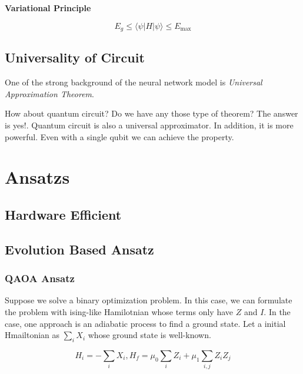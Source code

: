 \begin{principle}
    \textbf{Variational Principle}

    \begin{equation}
        E_{g} \leq \langle \psi | H | \psi \rangle \leq E_{\mbox{max}}
    \end{equation}
\end{principle}

\subsection{Universality of Circuit}

One of the strong background of the neural network model is 
\textit{Universal Approximation Theorem}. 

How about quantum circuit? Do we have any those type of theorem?
The answer is yes!. Quantum circuit is also a universal approximator.
In addition, it is more powerful. Even with a single qubit we can achieve the property\cite{PhysRevA.104.012405-Universal-approxi}.

\section{}

\section{Ansatzs}

\subsection{Hardware Efficient}

\subsection{Evolution Based Ansatz}

\subsubsection{QAOA Ansatz}

Suppose we solve a binary optimization problem.
In this case, we can formulate the problem with ising-like Hamilotnian whose terms only have $Z$ and $I$.
In the case, one approach is an adiabatic process to find a ground state.
Let a initial Hmailtonian as $\sum_i X_i$ whose ground state is well-known.

\begin{equation}
    H_i = -\sum_i X_i, H_f = \mu_0\sum_i Z_i + \mu_1 \sum_{i, j}  Z_i Z_j
\end{equation}

